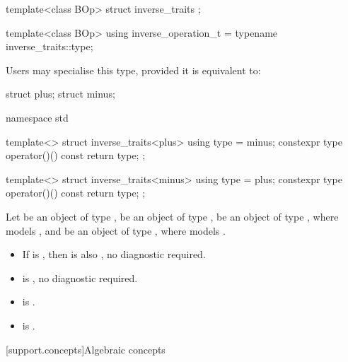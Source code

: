 \begin{itemdecl}
  template<class BOp>
  struct inverse_traits {};

  template<class BOp>
  using inverse_operation_t = typename inverse_traits::type;
\end{itemdecl}
\begin{itemdescr}
   \pnum
   Users may specialise this type, provided it is equivalent to:
   \begin{codeblock}
struct plus;
struct minus;

namespace std {
  template<>
  struct inverse_traits<plus> {
     using type = minus;
     constexpr type operator()() const { return type{}; }
  };

  template<>
  struct inverse_traits<minus> {
     using type = plus;
     constexpr type operator()() const { return type{}; }
  };
}
   \end{codeblock}

   \pnum
   Let  be an object of type ,  be an object of type ,
    be an object of type , where  models , and
    be an object of type , where  models .

   \pnum
   \mandates
      \begin{itemize}
         \item If  is , then
                is also , no diagnostic
               required.
         \item {} is , no diagnostic required.
      \end{itemize}
   \pnum
   \expects
      \begin{itemize}
         \item {} is .
         \item {} is .
      \end{itemize}
\end{itemdescr}


[support.concepts]{Algebraic concepts}

